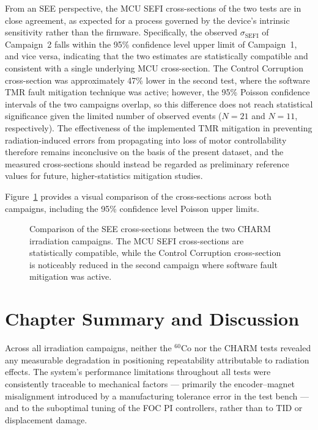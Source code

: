 From an SEE perspective, the MCU SEFI cross-sections of the two tests are in close agreement, as expected for a process governed by the device's intrinsic sensitivity rather than the firmware. Specifically, the observed $\sigma_\text{SEFI}$ of Campaign~2 falls within the 95\% confidence level upper limit of Campaign~1, and vice versa, indicating that the two estimates are statistically compatible and consistent with a single underlying MCU cross-section. The Control Corruption cross-section was approximately 47\% lower in the second test, where the software TMR fault mitigation technique was active; however, the 95\% Poisson confidence intervals of the two campaigns overlap, so this difference does not reach statistical significance given the limited number of observed events ($N=21$ and $N=11$, respectively). The effectiveness of the implemented TMR mitigation in preventing radiation-induced errors from propagating into loss of motor controllability therefore remains inconclusive on the basis of the present dataset, and the measured cross-sections should instead be regarded as preliminary reference values for future, higher-statistics mitigation studies.

Figure~\ref{fig:charm-cross-sections} provides a visual comparison of the cross-sections across both campaigns, including the 95\% confidence level Poisson upper limits.

\begin{figure}[H]
    \centering
    
    \caption{Comparison of the SEE cross-sections between the two CHARM irradiation campaigns. The MCU SEFI cross-sections are statistically compatible, while the Control Corruption cross-section is noticeably reduced in the second campaign where software fault mitigation was active.}
    \label{fig:charm-cross-sections}
\end{figure}

\section{Chapter Summary and Discussion}
\label{section:rad-tests-discussion}

Across all irradiation campaigns, neither the $^{60}$Co nor the CHARM tests revealed any measurable degradation in positioning repeatability attributable to radiation effects. The system's performance limitations throughout all tests were consistently traceable to mechanical factors --- primarily the encoder--magnet misalignment introduced by a manufacturing tolerance error in the test bench --- and to the suboptimal tuning of the FOC PI controllers, rather than to TID or displacement damage.

